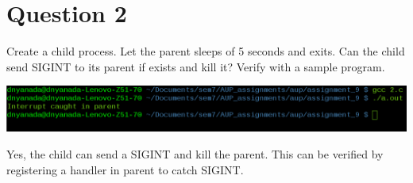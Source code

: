 \documentclass[main.tex]{subfiles}
\begin{document}
\section{Question 2}
Create a child process. Let the parent sleeps of 5 seconds and exits. Can the
child send SIGINT to its parent if exists and kill it? Verify with a sample
program.


\includegraphics[width=\textwidth]{figures/2_output.png}

Yes, the child can send a SIGINT and kill the parent. This can be verified by
registering a handler in parent to catch SIGINT.
\end{document}
